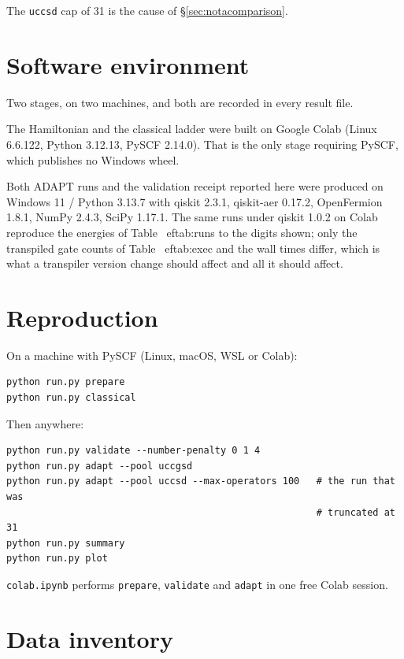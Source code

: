 \documentclass[11pt,a4paper]{article}
\newcommand{\code}[1]{\texttt{\small #1}}
\begin{document}
The \code{uccsd} cap of 31 is the cause of \S\ref{sec:notacomparison}.

\section{Software environment}

Two stages, on two machines, and both are recorded in every result file.

The Hamiltonian and the classical ladder were built on Google Colab (Linux
6.6.122, Python 3.12.13, PySCF 2.14.0). That is the only stage requiring PySCF,
which publishes no Windows wheel.

Both ADAPT runs and the validation receipt reported here were produced on
Windows 11 / Python 3.13.7 with qiskit 2.3.1, qiskit-aer 0.17.2, OpenFermion
1.8.1, NumPy 2.4.3, SciPy 1.17.1. The same runs under qiskit 1.0.2 on Colab
reproduce the energies of Table~
ef{tab:runs} to the digits shown; only the
transpiled gate counts of Table~
ef{tab:exec} and the wall times differ, which
is what a transpiler version change should affect and all it should affect.

\section{Reproduction}

On a machine with PySCF (Linux, macOS, WSL or Colab):

\begin{verbatim}
python run.py prepare
python run.py classical
\end{verbatim}

Then anywhere:

\begin{verbatim}
python run.py validate --number-penalty 0 1 4
python run.py adapt --pool uccgsd
python run.py adapt --pool uccsd --max-operators 100   # the run that was
                                                       # truncated at 31
python run.py summary
python run.py plot
\end{verbatim}

\code{colab.ipynb} performs \code{prepare}, \code{validate} and \code{adapt} in
one free Colab session.

\section{Data inventory}
\end{document}
